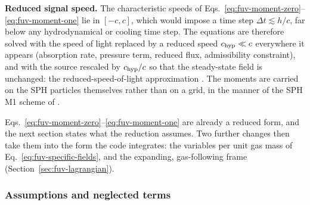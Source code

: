 \textbf{Reduced signal speed.} The characteristic speeds of
Eqs.~\ref{eq:fuv-moment-zero}--\ref{eq:fuv-moment-one} lie in
$[-c, c]$, which would impose a time step $\Delta t \lesssim h/c$, far
below any hydrodynamical or cooling time step. The equations are
therefore solved with the speed of light replaced by a reduced speed
$c_{\rm hyp}\ll c$ everywhere it appears (absorption rate, pressure
term, reduced flux, admissibility constraint), and with the source
rescaled by $c_{\rm hyp}/c$ so that the steady-state field is unchanged:
the reduced-speed-of-light approximation
\citep{GnedinAbel2001,Rosdahl2013}. The moments are carried on the SPH
particles themselves rather than on a grid, in the manner of the SPH M1
scheme of \citet{Chan2021}.

Eqs.~\ref{eq:fuv-moment-zero}--\ref{eq:fuv-moment-one} are already a
reduced form, and the next section states what the reduction assumes.
Two further changes then take them into the form the code integrates: the
variables per unit gas mass of Eq.~\ref{eq:fuv-specific-fields}, and the
expanding, gas-following frame (Section~\ref{sec:fuv-lagrangian}).

\subsubsection{Assumptions and neglected terms}
\label{sec:fuv-assumptions}

